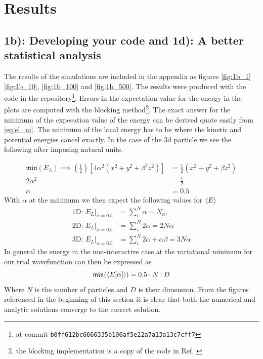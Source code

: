 \section{Results}
\subsection*{\textbf{1b):} Developing your code and \textbf{1d):} A better statistical analysis}

The results of the simulations are included in the appendix as figures \ref{fig:1b_1} \ref{fig:1b_10}, \ref{fig:1b_100} and \ref{fig:1b_500}. The results were produced with the code in the repository\footnote{at commit \lstinline{b0ff612bc6666335b106af5e22a7a13a13c7cff7}}. Errors in the expectation value for the energy in the plots are computed with the blocking method\footnote{the blocking implementation is a copy of the code in Ref. \cite{ComphysGit}}. 
The exact answer for the minimum of the expecation value of the energy can be derived quote easily from \ref{eq:el_ni}. The minimum of the local energy has to be where the kinetic and potential energies cancel exactly. In the case of the 3d particle we see the following after imposing natural units. 

\begin{align}
\mathfrak{min}(E_L)  \implies \left(\frac{1}{2}\right)[4\alpha^2 (x^2 + y^2 + \beta^2 z^2) ] &= \frac{1}{2} (x^2 + y^2 + \beta z^2) \\
 2 \alpha ^2  &= \frac{1}{2} \\
 \alpha &= 0.5
\end{align}
With $\alpha$ at the minimum we then expect the following values for $\langle E \rangle$
\begin{equation}
\begin{split}
\text{1D: }E_L |_{\alpha = 0.5} &= \sum_i^N \alpha = N_ \alpha,\\
\text{2D: }E_L|_{\alpha = 0.5} &= \sum_i^N  2\alpha = 2N \alpha \\
\text{3D: }E_L|_{\alpha = 0.5} &= \sum_i^N  2\alpha + \alpha \beta  = 3N\alpha
\end{split}
\end{equation}
In general the energy in the non-interactive case at the variational minimum for our trial wavefunction can then be expressed as 
\begin{equation}
\mathfrak{min}(\langle E[\alpha] \rangle) = 0.5 \cdot N \cdot D  
\end{equation}
Where $N$ is the number of particles and $D$ is their dimension. From the figures referenced in the beginning of this section it is clear that both the numerical and analytic solutions converge to the correct solution.

